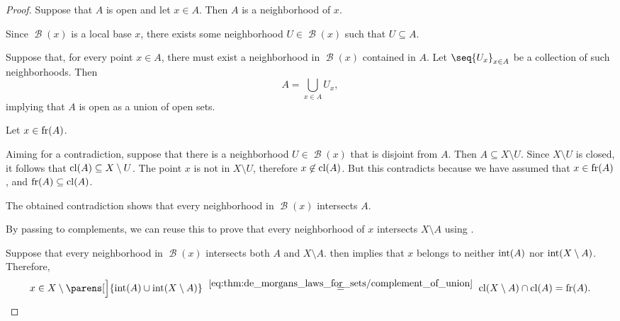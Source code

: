 \begin{proof}

  \SufficiencySubProof* Suppose that \( A \) is open and let \( x \in A \). Then \( A \) is a neighborhood of \( x \).

  Since \( \mscrB(x) \) is a local base \( x \), there exists some neighborhood \( U \in \mscrB(x) \) such that \( U \subseteq A \).

  \NecessitySubProof* Suppose that, for every point \( x \in A \), there must exist a neighborhood in \( \mscrB(x) \) contained in \( A \). Let \( \seq{ U_x }_{x \in A} \) be a collection of such neighborhoods. Then
  \begin{equation*}
    A = \bigcup_{x \in A} U_x,
  \end{equation*}
  implying that \( A \) is open as a union of open sets.


  \SufficiencySubProof* Let \( x \in \operatorname{fr}(A) \).

  Aiming for a contradiction, suppose that there is a neighborhood \( U \in \mscrB(x) \) that is disjoint from \( A \). Then \( A \subseteq X \setminus U \). Since \( X \setminus U \) is closed, it follows that \( \operatorname{cl}(A) \subseteq X \setminus U \). The point \( x \) is not in \( X \setminus U \), therefore \( x \not\in \operatorname{cl}(A) \). But this contradicts  because we have assumed that \( x \in \operatorname{fr}(A) \), and \( \operatorname{fr}(A) \subseteq \operatorname{cl}(A) \).

  The obtained contradiction shows that every neighborhood in \( \mscrB(x) \) intersects \( A \).

  By passing to complements, we can reuse this to prove that every neighborhood of \( x \) intersects \( X \setminus A \) using .

  \NecessitySubProof* Suppose that every neighborhood in \( \mscrB(x) \) intersects both \( A \) and \( X \setminus A \).  then implies that \( x \) belongs to neither \( \operatorname{int}(A) \) nor \( \operatorname{int}(X \setminus A) \). Therefore,
  \begin{equation*}
    x
    \in
    X \setminus \parens[\Big]{ \Int(A) \cup \Int(X \setminus A) }
    \reloset {\eqref{eq:thm:de_morgans_laws_for_sets/complement_of_union}} =
    \cl(X \setminus A) \cap \cl(A)
    =
    \fr(A).
  \end{equation*}


\end{proof}

